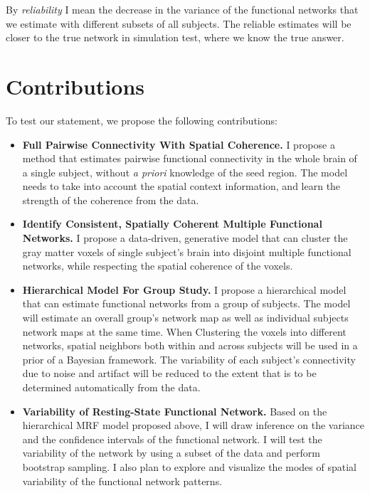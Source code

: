\documentclass[12pt]{article}
\begin{document}
By \emph{reliability} I mean the decrease in the variance of the functional
networks that we estimate with different subsets of all subjects. The reliable
estimates will be closer to the true network in simulation test, where we know
the true answer.



\section{Contributions}\label{sec:cont}
To test our statement, we propose the following contributions:
\begin{itemize}
  \item \textbf{Full Pairwise Connectivity With Spatial Coherence.} I propose a
    method that estimates pairwise functional connectivity in the whole brain of
    a single subject, without \emph{a priori} knowledge of the seed region. The
    model needs to take into account the spatial context information, and learn
    the strength of the coherence from the data.

  \item \textbf{Identify Consistent, Spatially Coherent Multiple Functional
    Networks.} I propose a data-driven, generative model that can cluster the
    gray matter voxels of single subject's brain into disjoint multiple
    functional networks, while respecting the spatial coherence of the voxels.

  \item \textbf{Hierarchical Model For Group Study.} I propose a hierarchical
    model that can estimate functional networks from a group of subjects. The
    model will estimate an overall group's network map as well as individual
    subjects network maps at the same time. When Clustering the voxels into
    different networks, spatial neighbors both within and across subjects will
    be used in a prior of a Bayesian framework. The variability of each
    subject's connectivity due to noise and artifact will be reduced to the
    extent that is to be determined automatically from the data.

  \item \textbf{Variability of Resting-State Functional Network. } Based on the
    hierarchical MRF model proposed above, I will draw inference on the variance
    and the confidence intervals of the functional network. I will test the
    variability of the network by using a subset of the data and perform
    bootstrap sampling. I also plan to explore and visualize the modes of
    spatial variability of the functional network patterns.
\end{itemize}
\end{document}
